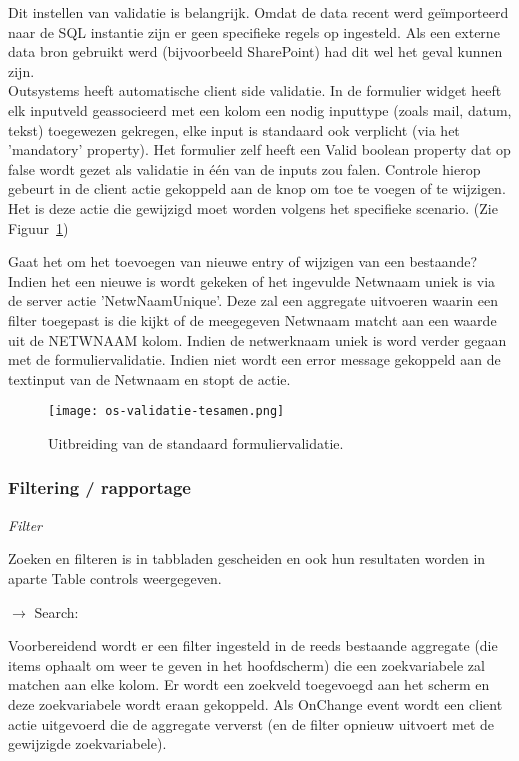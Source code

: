 Dit instellen van validatie is belangrijk. Omdat de data recent werd geïmporteerd naar de SQL instantie zijn er geen specifieke regels op ingesteld. Als een externe data bron gebruikt werd (bijvoorbeeld SharePoint) had dit wel het geval kunnen zijn.\\
Outsystems heeft automatische client side validatie. \autocite{OutSystemsDocs} In de formulier widget heeft elk inputveld geassocieerd met een kolom een nodig inputtype (zoals mail, datum, tekst) toegewezen gekregen, elke input is standaard ook verplicht (via het 'mandatory' property). Het formulier zelf heeft een Valid boolean property dat op false wordt gezet als validatie in één van de inputs zou falen. Controle hierop gebeurt in de client actie gekoppeld aan de knop om toe te voegen of te wijzigen. Het is deze actie die gewijzigd moet worden volgens het specifieke scenario. (Zie Figuur~\ref{fig:os-validatie-tesamen})

Gaat het om het toevoegen van nieuwe entry of wijzigen van een bestaande? Indien het een nieuwe is wordt gekeken of het ingevulde Netwnaam uniek is via de server actie 'NetwNaamUnique'. Deze zal een aggregate uitvoeren waarin een filter toegepast is  die kijkt of de meegegeven Netwnaam matcht aan een waarde uit de NETWNAAM kolom. Indien de netwerknaam uniek is word verder gegaan met de formuliervalidatie. Indien niet wordt een error message gekoppeld aan de textinput van de Netwnaam en stopt de actie.

\begin{figure}[h!]
    \texttt{[image: os-validatie-tesamen.png]}
    \caption{Uitbreiding van de standaard formuliervalidatie.}
    \label{fig:os-validatie-tesamen}
\end{figure}

\subsubsection{Filtering / rapportage}

\textit{Filter}

Zoeken en filteren is in tabbladen gescheiden en ook hun resultaten worden in aparte Table controls weergegeven.

$\rightarrow$ Search:

Voorbereidend wordt er een filter ingesteld in de reeds bestaande aggregate (die items ophaalt om weer te geven in het hoofdscherm) die een zoekvariabele zal matchen aan elke kolom.
Er wordt een zoekveld toegevoegd aan het scherm en deze zoekvariabele wordt eraan gekoppeld. Als OnChange event wordt een client actie uitgevoerd die de aggregate ververst (en de filter opnieuw uitvoert met de gewijzigde zoekvariabele).

